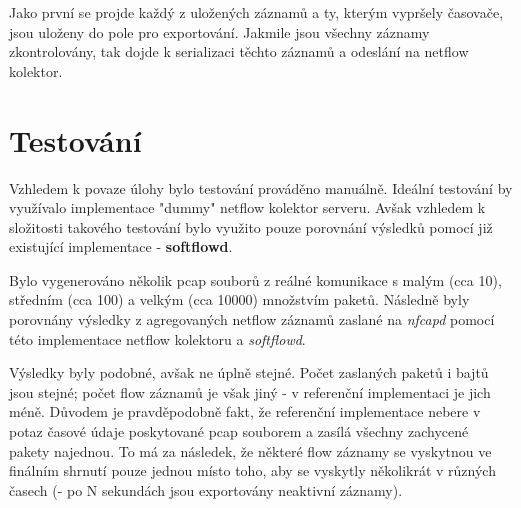 \documentclass{article}
\begin{document}
Jako první se projde každý z uložených záznamů a ty, kterým vypršely časovače,
jsou uloženy do pole pro exportování. Jakmile jsou všechny záznamy zkontrolovány,
tak dojde k serializaci těchto záznamů a odeslání na netflow kolektor.

\section{Testování}
Vzhledem k povaze úlohy bylo testování prováděno manuálně.
Ideální testování by využívalo implementace "dummy" netflow kolektor serveru.
Avšak vzhledem k složitosti takového testování bylo využito pouze porovnání výsledků
pomocí již existující implementace - \textbf{softflowd}.

Bylo vygenerováno několik pcap souborů z reálné komunikace s
malým (cca 10), středním (cca 100) a velkým (cca 10000) množstvím paketů.
Následně byly porovnány výsledky z agregovaných netflow záznamů
zaslané na \textit{nfcapd} pomocí této implementace netflow kolektoru
a \textit{softflowd}. 

Výsledky byly podobné, avšak ne úplně stejné. Počet zaslaných paketů
i bajtů jsou stejné; počet flow záznamů je však jiný
- v referenční implementaci je jich méně.
Důvodem je pravděpodobně fakt, že referenční implementace nebere
v potaz časové údaje poskytované pcap souborem a zasílá všechny
zachycené pakety najednou. To má za následek, že některé flow záznamy
se vyskytnou ve finálním shrnutí pouze jednou místo toho,
aby se vyskytly několikrát v různých časech
(- po N sekundách jsou exportovány neaktivní záznamy).
\end{document}
